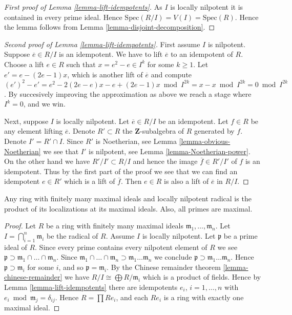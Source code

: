 \begin{proof}[First proof of Lemma \ref{lemma-lift-idempotents}]
As $I$ is locally nilpotent it is contained in every prime ideal.
Hence $\text{Spec}(R/I) = V(I) = \text{Spec}(R)$. Hence the
lemma follows from Lemma \ref{lemma-disjoint-decomposition}.
\end{proof}

\begin{proof}[Second proof of Lemma \ref{lemma-lift-idempotents}]
First assume $I$ is nilpotent.
Suppose $\overline{e} \in R/I$ is an idempotent.
We have to lift $\overline{e}$ to an idempotent of $R$.
Choose a lift $e \in R$ such that $x = e^2 - e \in I^k$ for some
$k\geq 1$. Let $e' = e - (2e-1)x$, which is another lift of $\overline{e}$
and compute $(e')^2 - e' =
e^2 - 2(2e-e)x - e + (2e-1)x \bmod I^{2k} =
x - x \bmod I^{2k} = 0 \bmod I^{2k}$.
By succesively improving the approximation as above we reach a
stage where $I^k = 0$, and we win.

\medskip\noindent
Next, suppose $I$ is locally nilpotent.
Let $\overline{e} \in R/I$ be an idempotent.
Let $f \in R$ be any element lifting $\overline{e}$.
Denote $R' \subset R$ the $\mathbf{Z}$-subalgebra of $R$ generated
by $f$. Denote $I' = R' \cap I$. Since $R'$ is Noetherian,
see Lemma \ref{lemma-obvious-Noetherian} we see that $I'$ is
nilpotent, see Lemma \ref{lemma-Noetherian-power}. On the other
hand we have $R' / I' \subset R/I$ and hence the image
$\overline{f} \in R'/I'$ of $f$ is an idempotent.
Thus by the first part of the proof we see that
we can find an idempotent $e \in R'$ which
is a lift of $\overline{f}$.
Then $e \in R$ is also a lift of $\overline{e}$ in $R/I$.
\end{proof}

\begin{lemma}
\label{lemma-product-local}
Any ring with finitely many maximal ideals and
locally nilpotent radical is the product of its localizations
at its maximal ideals. Also, all primes are maximal.
\end{lemma}

\begin{proof}
Let $R$ be a ring with finitely many maximal ideals
$\mathfrak m_1, \ldots, \mathfrak m_n$.
Let $I = \bigcap_{i = 1}^n \mathfrak m_i$
be the radical of $R$. Assume $I$ is locally nilpotent.
Let $\mathfrak p$ be a prime ideal of $R$.
Since every prime contains every nilpotent
element of $R$ we see
$ \mathfrak p \supset \mathfrak m_1 \cap \ldots \cap \mathfrak m_n$.
Since $\mathfrak m_1 \cap \ldots \cap \mathfrak m_n \supset
\mathfrak m_1 \ldots \mathfrak m_n$
we conclude $\mathfrak p \supset \mathfrak m_1 \ldots \mathfrak m_n$.
Hence $\mathfrak p \supset \mathfrak m_i$ for some $i$, and so
$\mathfrak p = \mathfrak m_i$. By the Chinese remainder
theorem \ref{lemma-chinese-remainder}
we have $R/I \cong \bigoplus R/\mathfrak m_i$
which is a product of fields.
Hence by Lemma \ref{lemma-lift-idempotents}
there are idempotents $e_i$, $i = 1, \ldots, n$
with $e_i \bmod \mathfrak m_j = \delta_{ij}$.
Hence $R = \prod Re_i$, and each $Re_i$ is a
ring with exactly one maximal ideal.
\end{proof}

